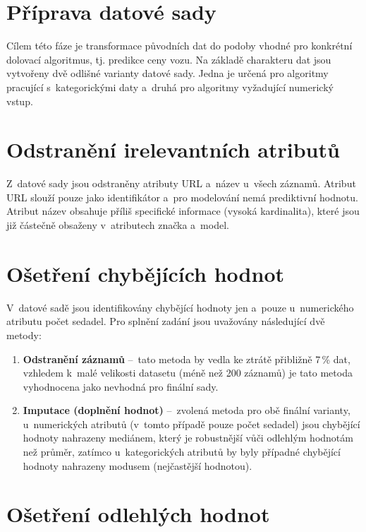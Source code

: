 \documentclass[a4paper, 11pt]{article}
\begin{document}
\section*{Příprava datové sady}

Cílem této fáze je transformace původních dat do podoby vhodné pro konkrétní dolovací algoritmus, tj. predikce ceny vozu.
Na základě charakteru dat jsou vytvořeny dvě odlišné varianty datové sady.
Jedna je určená pro algoritmy pracující s~kategorickými daty a~druhá pro algoritmy vyžadující numerický vstup.

\section*{Odstranění irelevantních atributů}

Z~datové sady jsou odstraněny atributy URL a~název u~všech záznamů.
Atribut URL slouží pouze jako identifikátor a~pro modelování nemá prediktivní hodnotu.
Atribut název obsahuje příliš specifické informace (vysoká kardinalita), které jsou již částečně obsaženy v~atributech značka a~model.

\section*{Ošetření chybějících hodnot}

V~datové sadě jsou identifikovány chybějící hodnoty jen a~pouze u~numerického atributu počet sedadel.
Pro splnění zadání jsou uvažovány následující dvě metody:

\begin{enumerate}
    \item \textbf{Odstranění záznamů} --~tato metoda by vedla ke ztrátě přibližně 7\,\% dat, vzhledem k~malé velikosti datasetu (méně než 200 záznamů) je tato metoda vyhodnocena jako nevhodná pro finální sady.
    \item \textbf{Imputace (doplnění hodnot)} --~zvolená metoda pro obě finální varianty, u~numerických atributů (v~tomto případě pouze počet sedadel) jsou chybějící hodnoty nahrazeny mediánem, který je robustnější vůči odlehlým hodnotám než průměr, zatímco u~kategorických atributů  by byly případné chybějící hodnoty nahrazeny modusem (nejčastější hodnotou).
\end{enumerate}

\section*{Ošetření odlehlých hodnot}
\end{document}
